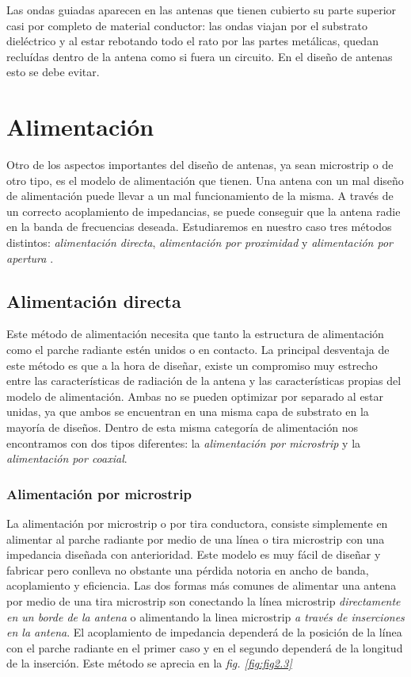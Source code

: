 Las ondas guiadas aparecen en las antenas que tienen cubierto su parte superior casi por completo de material conductor: las ondas viajan por el substrato dieléctrico y al estar rebotando todo el rato por las partes metálicas, quedan recluídas dentro de la antena como si fuera un circuito. En el diseño de antenas esto se debe evitar.


\section{Alimentación}\label{sec:alimentacion}

Otro de los aspectos importantes del diseño de antenas, ya sean microstrip o de otro tipo, es el modelo de alimentación que tienen. Una antena con un mal diseño de alimentación puede llevar a un mal funcionamiento de la misma. A través de un correcto acoplamiento de impedancias, se puede conseguir que la antena radie en la banda de frecuencias deseada. Estudiaremos en nuestro caso tres métodos distintos: \textit{alimentación directa}, \textit{alimentación por proximidad} y \textit{alimentación por apertura} \cite{garg,bhartia}.

\subsection{Alimentación directa}\label{subsec:alimentacion-directa}

Este método de alimentación necesita que tanto la estructura de alimentación como el parche radiante estén unidos o en contacto. La principal desventaja de este método es que a la hora de diseñar, existe un compromiso muy estrecho entre las características de radiación de la antena y las características propias del modelo de alimentación. Ambas no se pueden optimizar por separado al estar unidas, ya que ambos se encuentran en una misma capa de substrato en la mayoría de diseños. Dentro de esta misma categoría de alimentación nos encontramos con dos tipos diferentes: la \textit{alimentación por microstrip} y la \textit{alimentación por coaxial}.

\subsubsection{Alimentación por microstrip}

La alimentación por microstrip o por tira conductora, consiste simplemente en alimentar al parche radiante por medio de una línea o tira microstrip con una impedancia diseñada con anterioridad. Este modelo es muy fácil de diseñar y fabricar pero conlleva no obstante una pérdida notoria en ancho de banda, acoplamiento y eficiencia. Las dos formas más comunes de alimentar una antena por medio de una tira microstrip son conectando la línea microstrip \textit{directamente en un borde de la antena} o alimentando la linea microstrip \textit{a través de inserciones en la antena}. El acoplamiento de impedancia dependerá de la posición de la línea con el parche radiante en el primer caso y en el segundo dependerá de la longitud de la inserción. Este método se aprecia en la \textit{fig. \ref{fig:fig2.3}}

